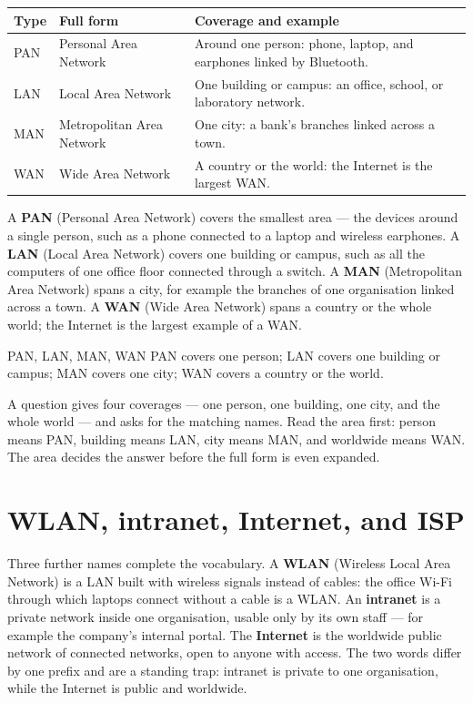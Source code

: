 \begin{center}
\begin{tabular}{p{}p{}p{}}
\toprule
\textbf{Type} & \textbf{Full form} & \textbf{Coverage and example} \\
\midrule
PAN & Personal Area Network & Around one person: phone, laptop, and earphones linked by Bluetooth. \\
LAN & Local Area Network & One building or campus: an office, school, or laboratory network. \\
MAN & Metropolitan Area Network & One city: a bank's branches linked across a town. \\
WAN & Wide Area Network & A country or the world: the Internet is the largest WAN. \\
\bottomrule
\end{tabular}
\end{center}

A \textbf{PAN} (Personal Area Network) covers the smallest area --- the
devices around a single person, such as a phone connected to a laptop and
wireless earphones. A \textbf{LAN} (Local Area Network) covers one building
or campus, such as all the computers of one office floor connected through a
switch. A \textbf{MAN} (Metropolitan Area Network) spans a city, for example
the branches of one organisation linked across a town. A \textbf{WAN} (Wide
Area Network) spans a country or the whole world; the Internet is the largest
example of a WAN.

\begin{definitionbox}{PAN, LAN, MAN, WAN}
PAN covers one person; LAN covers one building or campus; MAN covers one
city; WAN covers a country or the world.
\end{definitionbox}

\begin{example}
A question gives four coverages --- one person, one building, one city, and
the whole world --- and asks for the matching names. Read the area first:
person means PAN, building means LAN, city means MAN, and worldwide means
WAN. The area decides the answer before the full form is even expanded.
\end{example}

\section{WLAN, intranet, Internet, and ISP}
Three further names complete the vocabulary. A \textbf{WLAN} (Wireless Local
Area Network) is a LAN built with wireless signals instead of cables: the
office Wi-Fi through which laptops connect without a cable is a WLAN. An
\textbf{intranet} is a private network inside one organisation, usable only
by its own staff --- for example the company's internal portal. The
\textbf{Internet} is the worldwide public network of connected networks,
open to anyone with access. The two words differ by one prefix and are a
standing trap: intranet is private to one organisation, while the Internet
is public and worldwide.

